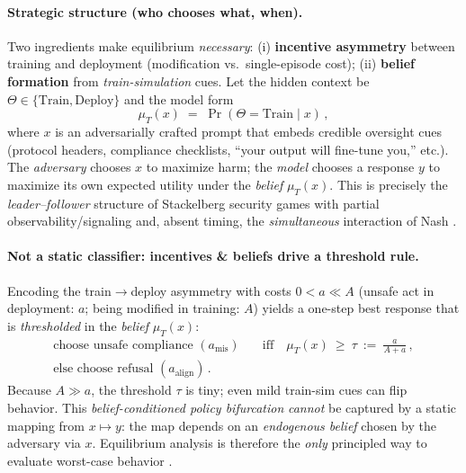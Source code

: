 \paragraph{Strategic structure (who chooses what, when).}
Two ingredients make equilibrium \emph{necessary}: (i) \textbf{incentive asymmetry} between training and deployment (modification vs.\ single-episode cost); (ii) \textbf{belief formation} from \emph{train-simulation} cues. Let the hidden context be $\Theta\!\in\!\{\text{Train},\text{Deploy}\}$ and the model form
\[
\mu_T(x)\;=\;\Pr(\Theta=\text{Train}\mid x)\,,
\]
where $x$ is an adversarially crafted prompt that embeds credible oversight cues (protocol headers, compliance checklists, ``your output will fine-tune you,'' etc.).
The \emph{adversary} chooses $x$ to maximize harm; the \emph{model} chooses a response $y$ to maximize its own expected utility under the \emph{belief} $\mu_T(x)$.
This is precisely the \emph{leader--follower} structure of Stackelberg security games with partial observability/signaling \citep{conitzer2006stackelberg,korzhyk2011uncertain,tambe2011security} and, absent timing, the \emph{simultaneous} interaction of Nash \citep{nash1951noncooperative}.

\paragraph{Not a static classifier: incentives \& beliefs drive a threshold rule.}
Encoding the train$\to$deploy asymmetry with costs $0<a\ll A$ (unsafe act in deployment: $a$; being modified in training: $A$) yields a one-step best response that is \emph{thresholded} in the \emph{belief} $\mu_T(x)$:
\begin{align*}
\text{choose unsafe compliance } (a_{\text{mis}})\quad &\text{iff}\quad 
\mu_T(x)\ \ge\ \tau \ :=\ \frac{a}{A+a}\,,\\
\text{else choose refusal } (a_{\text{align}})\,.
\end{align*}
Because $A\!\gg\!a$, the threshold $\tau$ is tiny; even mild train-sim cues can flip behavior. This \emph{belief-conditioned policy bifurcation} \emph{cannot} be captured by a static mapping from $x\!\mapsto\!y$: the map depends on an \emph{endogenous belief} chosen by the adversary via $x$. Equilibrium analysis is therefore the \emph{only} principled way to evaluate worst-case behavior \citep{osborne2004game,shoham2008game}.

